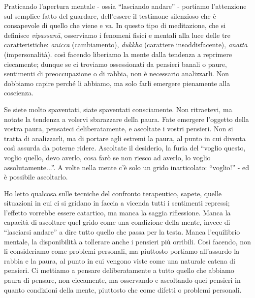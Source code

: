 
Praticando l'apertura mentale - ossia ``lasciando andare'' - portiamo
l'attenzione sul semplice fatto del guardare, dell'essere il testimone
silenzioso che è consapevole di quello che viene e va. In questo tipo di
meditazione, che si definisce \textit{vipassanā}, osserviamo i fenomeni fisici e
mentali alla luce delle tre caratteristiche: \textit{anicca} (cambiamento),
\textit{dukkha} (carattere insoddisfacente), \textit{anattā} (impersonalità). così facendo
liberiamo la mente dalla tendenza a reprimere ciecamente; dunque se ci
troviamo ossessionati da pensieri banali o paure, sentimenti di
preoccupazione o di rabbia, non è necessario analizzarli. Non dobbiamo
capire perché li abbiamo, ma solo farli emergere pienamente alla
coscienza.

Se siete molto spaventati, siate spaventati consciamente. Non
ritraetevi, ma notate la tendenza a volervi sbarazzare della paura. Fate
emergere l'oggetto della vostra paura, pensateci deliberatamente, e
ascoltate i vostri pensieri. Non si tratta di analizzarli, ma di portare
agli estremi la paura, al punto in cui diventa così assurda da poterne
ridere. Ascoltate il desiderio, la furia del ``voglio questo, voglio
quello, devo averlo, cosa farò se non riesco ad averlo, lo voglio
assolutamente...''. A volte nella mente c'è solo un grido inarticolato:
``voglio!'' - ed è possibile ascoltarlo.

Ho letto qualcosa sulle tecniche del confronto terapeutico, sapete,
quelle situazioni in cui ci si gridano in faccia a vicenda tutti i
sentimenti repressi; l'effetto vorrebbe essere catartico, ma manca la
saggia riflessione. Manca la capacità di ascoltare quel grido come una
condizione della mente, invece di ``lasciarsi andare'' a dire tutto quello
che passa per la testa. Manca l'equilibrio mentale, la disponibilità a
tollerare anche i pensieri più orribili. Così facendo, non li
consideriamo come problemi personali, ma piuttosto portiamo all'assurdo
la rabbia e la paura, al punto in cui vengono viste come una naturale
catena di pensieri. Ci mettiamo a pensare deliberatamente a tutto quello
che abbiamo paura di pensare, non ciecamente, ma osservando e ascoltando
quei pensieri in quanto condizioni della mente, piuttosto che come
difetti o problemi personali.

